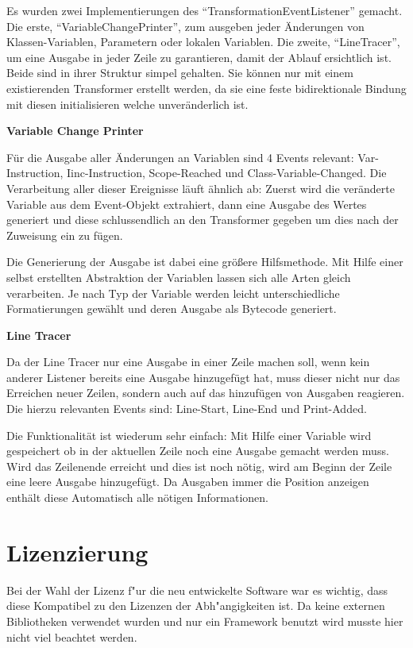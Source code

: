 Es wurden zwei Implementierungen des "`TransformationEventListener"' gemacht. Die erste, "`VariableChangePrinter"', zum ausgeben jeder Änderungen von Klassen-Variablen, Parametern oder lokalen Variablen. Die zweite, "`LineTracer"', um eine Ausgabe in jeder Zeile zu garantieren, damit der Ablauf ersichtlich ist. Beide sind in ihrer Struktur simpel gehalten. Sie können nur mit einem existierenden Transformer erstellt werden, da sie eine feste bidirektionale Bindung mit diesen initialisieren welche unveränderlich ist.

\textbf{Variable Change Printer}

Für die Ausgabe aller Änderungen an Variablen sind 4 Events relevant: Var-Instruction, Iinc-Instruction, Scope-Reached und Class-Variable-Changed. Die Verarbeitung aller dieser Ereignisse läuft ähnlich ab: Zuerst wird die veränderte Variable aus dem Event-Objekt extrahiert, dann eine Ausgabe des Wertes generiert und diese schlussendlich an den Transformer gegeben um dies nach der Zuweisung ein zu fügen.

Die Generierung der Ausgabe ist dabei eine größere Hilfsmethode. Mit Hilfe einer selbst erstellten Abstraktion der Variablen lassen sich alle Arten gleich verarbeiten. Je nach Typ der Variable werden leicht unterschiedliche Formatierungen gewählt und deren Ausgabe als Bytecode generiert.

\textbf{Line Tracer}

Da der Line Tracer nur eine Ausgabe in einer Zeile machen soll, wenn kein anderer Listener bereits eine Ausgabe hinzugefügt hat, muss dieser nicht nur das Erreichen neuer Zeilen, sondern auch auf das hinzufügen von Ausgaben reagieren. Die hierzu relevanten Events sind: Line-Start, Line-End und Print-Added.

Die Funktionalität ist wiederum sehr einfach: Mit Hilfe einer Variable wird gespeichert ob in der aktuellen Zeile noch eine Ausgabe gemacht werden muss. Wird das Zeilenende erreicht und dies ist noch nötig, wird am Beginn der Zeile eine leere Ausgabe hinzugefügt. Da Ausgaben immer die Position anzeigen enthält diese Automatisch alle nötigen Informationen.

\section{Lizenzierung} 

Bei der Wahl der Lizenz f"ur die neu entwickelte Software war es wichtig, dass diese Kompatibel zu den Lizenzen der Abh"angigkeiten ist. Da keine externen Bibliotheken verwendet wurden und nur ein Framework benutzt wird musste hier nicht viel beachtet werden.

